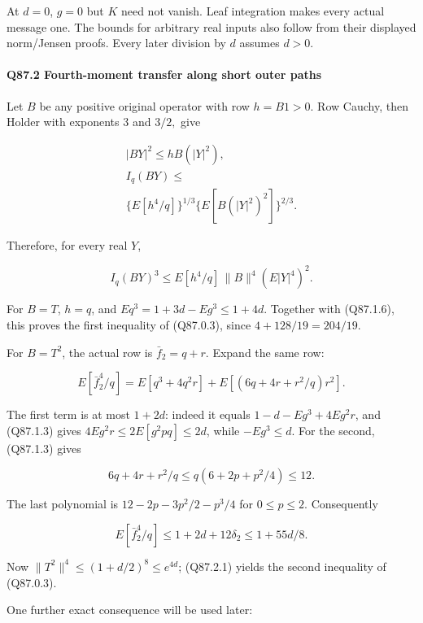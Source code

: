 At \(d=\allowbreak 0\), \(g=\allowbreak 0\) but \(K\) need not vanish. Leaf integration
makes every actual message one. The bounds for arbitrary real inputs
also follow from their displayed norm/Jensen proofs. Every later
division by \(d\) assumes \(d>\allowbreak 0\).

\paragraph{Q87.2 Fourth-moment transfer along short outer paths}\label{part:Q87.2}

Let \(B\) be any positive original operator with row \(h=\allowbreak B1>\allowbreak 0\).
Row Cauchy, then Holder with exponents 3 and \(3/2,\allowbreak \) give

\[
\begin{gathered}
|BY|^2\le hB(|Y|^2),\qquad\\
I_q(BY)\le\\
\{E[h^4/q]\}^{1/3}\{E[B(|Y|^2)^2]\}^{2/3}.
\end{gathered}
\]

Therefore, for every real \(Y\),

\[
 I_q(BY)^3\le E[h^4/q]\,\|B\|^4(E|Y|^4)^2.
 \tag{Q87.2.1}\label{eq:Q87:2.1}
\]

For \(B=\allowbreak T\), \(h=\allowbreak q\), and
\(Eq^3=\allowbreak 1+3d-Eg^3\le\allowbreak 1+4d\). Together with (Q87.1.6), this proves
the first inequality of (Q87.0.3), since \(4+128/19=\allowbreak 204/19\).

For \(B=\allowbreak T^2\), the actual row is \(\bar f_2=\allowbreak q+r\). Expand the same row:

\[
 E[\bar f_2^4/q]
 =E[q^3+4q^2r]+E[(6q+4r+r^2/q)r^2].
\]

The first term is at most \(1+2d\): indeed it equals
\(1-d-Eg^3+4Eg^2r\), and (Q87.1.3) gives
\(4Eg^2r\le\allowbreak 2E[g^2pq]\le\allowbreak 2d\), while \(-Eg^3\le\allowbreak  d\).
For the second, (Q87.1.3) gives

\[
 6q+4r+r^2/q\le q(6+2p+p^2/4)\le12.
\]

The last polynomial is \(12-2p-3p^2/2-p^3/4\) for \(0\le\allowbreak  p\le\allowbreak 2\).
Consequently

\[
 E[\bar f_2^4/q]\le1+2d+12\delta_2\le1+55d/8.
 \tag{Q87.2.2}\label{eq:Q87:2.2}
\]

Now \(\|T^2\|^4\le\allowbreak (1+d/2)^8\le\allowbreak  e^{4d}\); (Q87.2.1) yields
the second inequality of (Q87.0.3). 

One further exact consequence will be used later:

